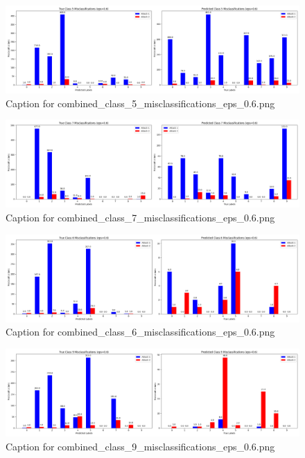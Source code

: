 \documentclass[11pt,onside]{article}
\begin{document}
\begin{figure}[ht]
\centering
\includegraphics[width=1\textwidth]{combined_class_boundary_pgd/combined_class_5_misclassifications_eps_0.6.png}
\caption{Caption for combined_class_5_misclassifications_eps_0.6.png}
\label{fig:combined_class_5_misclassifications_eps_0.6.png}
\end{figure}



\begin{figure}[ht]
\centering
\includegraphics[width=1\textwidth]{combined_class_boundary_pgd/combined_class_7_misclassifications_eps_0.6.png}
\caption{Caption for combined_class_7_misclassifications_eps_0.6.png}
\label{fig:combined_class_7_misclassifications_eps_0.6.png}
\end{figure}

\begin{figure}[ht]
\centering
\includegraphics[width=1\textwidth]{combined_class_boundary_pgd/combined_class_6_misclassifications_eps_0.6.png}
\caption{Caption for combined_class_6_misclassifications_eps_0.6.png}
\label{fig:combined_class_6_misclassifications_eps_0.6.png}
\end{figure}

\begin{figure}[ht]
\centering
\includegraphics[width=1\textwidth]{combined_class_boundary_pgd/combined_class_9_misclassifications_eps_0.6.png}
\caption{Caption for combined_class_9_misclassifications_eps_0.6.png}
\label{fig:combined_class_9_misclassifications_eps_0.6.png}
\end{figure}
\end{document}
